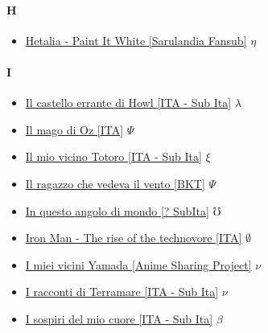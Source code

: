 		\paragraph{H} \hypertarget{FH}{}
			\begin{itemize}
			
				\item \href{https://mega.nz/#!9VcBjAoS!xwF1FRV60OIT4gDheeYbgvHSkJNrxkqN9XVME4ZukIo} {Hetalia - Paint It White [Sarulandia Fansub]}  $\eta$   \\
			
		\end{itemize}	
		
		\paragraph{I} \hypertarget{FI}{}
			\begin{itemize}
				
				\item \href{https://mega.nz/#!CohVFQDQ!By0Zn8JcQAud5qFvUHQxJOwWHJISrFsJLMSyZZlgruA} {Il castello errante di Howl [ITA - Sub Ita]}  $\lambda$   \\
				\item \href{https://mega.nz/#!4bphBJ4C!qD8TImHUOhhOO_w53ATcAVvppTYmfV-UrOx21vbxKKc} {Il mago di Oz [ITA]}  $\Psi$   \\
				\item \href{https://mega.nz/#!7oBS1TJY!BuWoBZ54nKjdTxPiBiMNkJRIMaaaFdY48C_oKXnSppg} {Il mio vicino Totoro [ITA - Sub Ita]}  $\xi$   \\
				\item \href{https://mega.nz/#!IC5W0DzR!37sp4hmzIkRzSg0-5l0iUFeDLJCKj2PEDeUYSR_2DCs} {Il ragazzo che vedeva il vento [BKT]}  $\Psi$   \\
				\item \href{https://mega.nz/#!OyxCjTDA!0WOAL6LPhSblCtm1icY3QKdu_FAmSDUy7GmKY1GcBE8} {In questo angolo di mondo [? SubIta]}  $\mho$   \\
				\item \href{https://mega.nz/#!kLZViIaD!xYVFZIKPOJIxsCf-AYKmnCDm22baFX_vsbQNbbkCN-M} {Iron Man - The rise of the technovore [ITA]}  $\emptyset$   \\
				\item \href{https://mega.nz/#F!vk9RkbBT!QoN4AdUDw6IU3QGhUxa57w} {I miei vicini Yamada [Anime Sharing Project]}  $\nu$   \\
				\item \href{https://mega.nz/#!D4sjkIDY!-avLrCQ4D8BldWvoNH_EQ2w-9HxOn2YfxxQbik53Ikk} {I racconti di Terramare [ITA - Sub Ita]}  $\nu$   \\
				\item \href{https://mega.nz/#F!T95lAKZa!Mmlmt02xMPEY1tVeD9Vqiw} {I sospiri del mio cuore [ITA - Sub Ita]}  $\beta$   \\
				
			\end{itemize}
		
